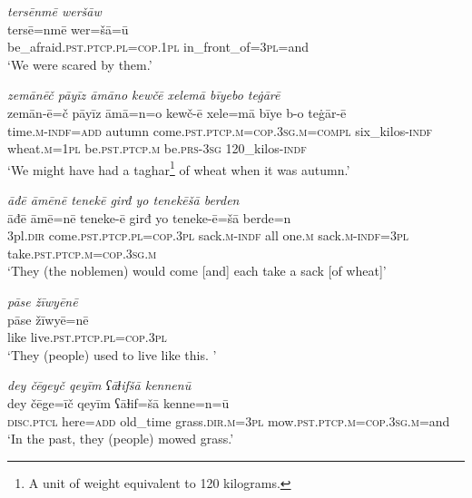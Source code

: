 \ea \label{RE.69}
\textit{tersēnmē weršāw} \\ 
\gll tersē=nmē wer=šā=ū \\ 
 be\_afraid\textsc{.pst}\textsc{.ptcp}\textsc{.pl}\textsc{=cop}\textsc{.\textsc{1pl}} in\_front\_of\textsc{=3pl}=and \\ 
\glt `We were scared by them.'
\z 
 
\ea \label{RE.70}
\textit{zemānēč pāyīz āmāno kewčē xelemā bīyebo teġārē} \\ 
\gll zemān-ē=č pāyīz āmā=n=o kewč-ē xele=mā bīye b-o teġār-ē \\ 
 time\textsc{.m}\textsc{-indf}\textsc{=add} autumn come\textsc{.pst}\textsc{.ptcp}\textsc{.m}\textsc{=cop}\textsc{.3sg}\textsc{.m}\textsc{=compl} six\_kilos\textsc{-indf} wheat\textsc{.m}\textsc{=\textsc{1pl}} be\textsc{.pst}\textsc{.ptcp}\textsc{.m} be\textsc{.prs}\textsc{-3sg} 120\_kilos\textsc{-indf} \\ 
\glt `We might have had a taghar\footnote{A unit of weight equivalent to 120 kilograms.} of wheat when it was autumn.'
\z 
 
\ea \label{RE.71}
\textit{āđē āmēnē tenekē girđ yo tenekēšā berden} \\ 
\gll āđē āmē=nē teneke-ē girđ yo teneke-ē=šā berde=n \\ 
 3pl\textsc{.dir} come\textsc{.pst}\textsc{.ptcp}\textsc{.pl}\textsc{=cop}\textsc{.3pl} sack\textsc{.m}\textsc{-indf} all one\textsc{.m} sack\textsc{.m}\textsc{-indf}\textsc{=3pl} take\textsc{.pst}\textsc{.ptcp}\textsc{.m}\textsc{=cop}\textsc{.3sg}\textsc{.m} \\ 
\glt `They (the noblemen) would come [and] each take a sack [of wheat]'
\z 
 
\ea \label{RE.72}
\textit{pāse žīwyēnē} \\ 
\gll pāse žīwyē=nē \\ 
 like live\textsc{.pst}\textsc{.ptcp}\textsc{.pl}\textsc{=cop}\textsc{.3pl} \\ 
\glt `They (people) used to live like this. '
\z 
 
 


\ea \label{ŽE.1}
\textit{dey čēgeyč qeyīm ʕāɫifšā kennenū} \\ 
\gll dey čēge=īč qeyīm ʕāɫif=šā kenne=n=ū \\ 
 \textsc{disc.ptcl} here\textsc{=add} old\_time grass\textsc{.dir}\textsc{.m}\textsc{=3pl} mow\textsc{.pst}\textsc{.ptcp}\textsc{.m}\textsc{=cop}\textsc{.3sg}\textsc{.m}=and \\ 
\glt `In the past, they (people) mowed grass.'
\z 
 
